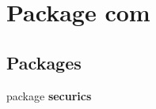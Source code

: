 \section{Package com}
\label{namespacecom}
\subsection*{Packages}
\begin{DoxyCompactItemize}
\item 
package {\bf securics}
\end{DoxyCompactItemize}
